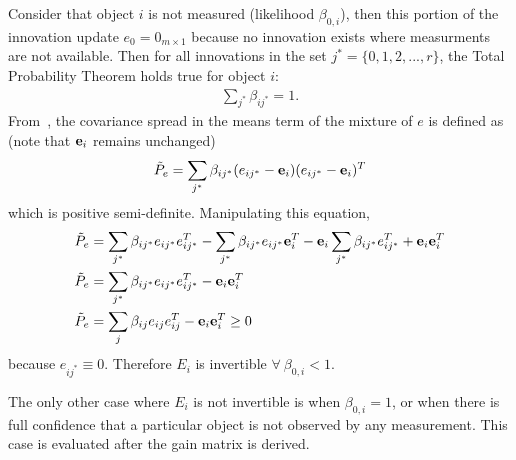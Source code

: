 \documentclass[10pt]{article}
\theoremstyle{plain}\theorembodyfont{\normalfont}
\begin{document}
Consider that object $i$ is not measured (likelihood $\beta_{0,i}$), then this portion of the innovation update $e_0=0_{m\times1}$ because no innovation exists where measurments are not available. Then for all innovations in the set $j^*=\{0,1, 2,...,r\}$, the Total Probability Theorem holds true for object $i$:
\begin{align}
\sum\limits_{j^*}\beta_{ij^*}=1.
\end{align}
From~\cite[Eq. 1.4.16-(1-10)]{ShaRonThi2001}, the covariance spread in the means term of the mixture of $e$ is defined as (note that ${\bf e}_{i}$ remains unchanged)
\begin{align}
\tilde P_e=\sum\limits_{j^*}\beta_{ij^*}(e_{ij^*}-{\bf e}_{i})(e_{ij^*}-{\bf e}_{i})^T
\end{align}
which is positive semi-definite. Manipulating this equation,
\begin{align}
\tilde P_e&=\sum\limits_{j^*}\beta_{ij^*}e_{ij^*}e_{ij^*}^T
-\sum\limits_{j^*}\beta_{ij^*}e_{ij^*}{\bf e}_{i}^T
-{\bf e}_{i}\sum\limits_{j^*}\beta_{ij^*}e_{ij^*}^T
+{\bf e}_{i}{\bf e}_{i}^T
\\
\tilde P_e&=\sum\limits_{j^*}\beta_{ij^*}e_{ij^*}e_{ij^*}^T-{\bf e}_{i}{\bf e}_{i}^T
\\
\tilde P_e&=\sum\limits_{j}\beta_{ij}e_{ij}e_{ij}^T-{\bf e}_{i}{\bf e}_{i}^T\geq0
\label{eqn:CovSpreadPSD}
\end{align}
because $e_{ij^*}\equiv0$. Therefore $E_i$ is invertible $\forall\ \beta_{0,i}<1$.



The only other case where $E_i$ is not invertible is when $\beta_{0,i}=1$, or when there is full confidence that a particular object is not observed by any measurement. This case is evaluated after the gain matrix is derived.
\end{document}
